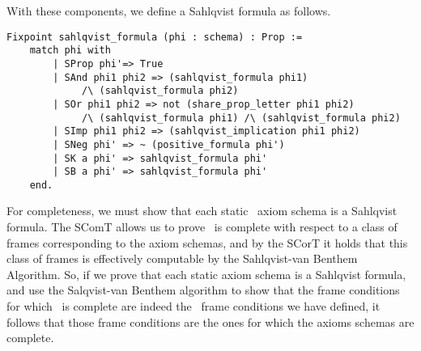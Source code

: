 With these components, we define a Sahlqvist formula as follows.

\begin{tcolorbox}
	\begin{lstlisting}[language=Coq]
Fixpoint sahlqvist_formula (phi : schema) : Prop :=
	match phi with
		| SProp phi'=> True
		| SAnd phi1 phi2 => (sahlqvist_formula phi1)
			 /\ (sahlqvist_formula phi2)
		| SOr phi1 phi2 => not (share_prop_letter phi1 phi2)
			 /\ (sahlqvist_formula phi1) /\ (sahlqvist_formula phi2)
		| SImp phi1 phi2 => (sahlqvist_implication phi1 phi2)
		| SNeg phi' => ~ (positive_formula phi')
		| SK a phi' => sahlqvist_formula phi'
		| SB a phi' => sahlqvist_formula phi'
	end.
	\end{lstlisting}
\end{tcolorbox}
 
For completeness, we must show that each static \DASL\ axiom schema is a Sahlqvist formula. The SComT allows us to prove \DASL\ is complete with respect to a class of frames corresponding to the axiom schemas, and by the SCorT it holds that this class of frames is effectively computable by the Sahlqvist-van Benthem Algorithm. So, if we prove that each static axiom schema is a Sahlqvist formula, and use the Salqvist-van Benthem algorithm to show that the frame conditions for which \DASL\ is complete are indeed the \DASL\ frame conditions we have defined, it follows that those frame conditions are the ones for which the axioms schemas are complete.


